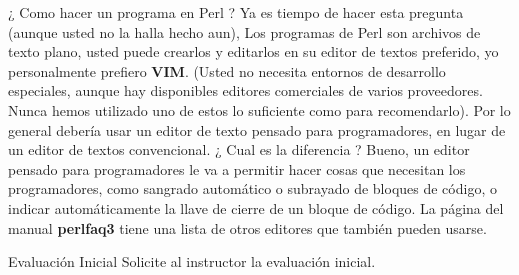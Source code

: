 \documentclass{beamer}
\begin{document}
\begin{frame}{¿ Como hacer un programa en Perl ?} %
Ya es tiempo de hacer esta pregunta (aunque usted no la halla hecho aun), Los
programas de Perl son archivos de texto plano, usted puede crearlos y editarlos
en su editor de textos preferido,  yo personalmente prefiero {\bf VIM}. 
(Usted no 
necesita entornos de desarrollo especiales, aunque hay disponibles editores
comerciales de varios proveedores. Nunca hemos utilizado uno de estos lo
suficiente como para recomendarlo). Por lo general debería usar un editor de
texto pensado para programadores, en lugar de un editor de textos
convencional. ¿ Cual es la diferencia ? Bueno, un editor pensado para
programadores le va a permitir hacer cosas que necesitan los programadores,
como sangrado automático o subrayado de bloques de código, o indicar
automáticamente la llave de cierre de un bloque de código. 
La página del manual {\bf perlfaq3} tiene una
lista de otros editores que también pueden usarse.
\end{frame}

\begin{frame}{Evaluación Inicial} %
    Solicite al instructor la evaluación inicial.
\end{frame}
\end{document}
